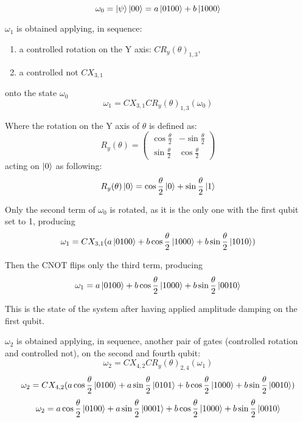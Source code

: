 \documentclass{masterthesis}
\begin{document}
\begin{equation}
    \omega_0 = \ket{\psi}\ket{00} = a\ket{0100} + b\ket{1000}
\end{equation}

$\omega_1$ is obtained applying, in sequence:
\begin{enumerate}
    \item a controlled rotation on the Y axis: $CR_{y}(\theta)_{1,3}$,
    \item a controlled not $CX_{3,1}$
\end{enumerate}
onto the state $\omega_0$
\begin{equation}
    \omega_1 = CX_{3,1} CR_{y}(\theta)_{1,3} (\omega_0)
\end{equation}

Where the rotation on the Y axis of $\theta$ is defined as:
\begin{equation}
    R_y(\theta) = \begin{pmatrix} \cos\frac{\theta}{2} & -\sin\frac{\theta}{2} \\ \sin\frac{\theta}{2} & \cos\frac{\theta}{2} \end{pmatrix}
\end{equation}
acting on $\ket{0}$ as following:
\begin{equation}
    R_y(\theta)\ket{0} = \cos\frac{\theta}{2}\ket{0} + \sin\frac{\theta}{2}\ket{1}
\end{equation}

Only the second term of $\omega_0$ is rotated, as it is the only one with the first qubit set to 1, producing
\begin{equation}
    \omega_1 = CX_{3,1} (a\ket{0100} + b\cos\frac{\theta}{2}\ket{1000} + b\sin\frac{\theta}{2}\ket{1010})
\end{equation}

Then the CNOT flips only the third term, producing
\begin{equation}
    \omega_1 = a\ket{0100} + b\cos\frac{\theta}{2}\ket{1000} + b\sin\frac{\theta}{2}\ket{0010}
\end{equation}

This is the state of the system after having applied amplitude damping on the first qubit.

$\omega_2$ is obtained applying, in sequence, another pair of gates (controlled rotation and controlled not), on the second and fourth qubit:
\begin{equation}
    \omega_2 = CX_{4,2} CR_{y}(\theta)_{2,4} (\omega_1)
\end{equation}
\begin{equation}
    \omega_2 = CX_{4,2} (a\cos\frac{\theta}{2}\ket{0100} + a\sin\frac{\theta}{2}\ket{0101} + b\cos\frac{\theta}{2}\ket{1000} + b\sin\frac{\theta}{2}\ket{0010})
\end{equation}
\begin{equation}
    \omega_2 = a\cos\frac{\theta}{2}\ket{0100} + a\sin\frac{\theta}{2}\ket{0001} + b\cos\frac{\theta}{2}\ket{1000} + b\sin\frac{\theta}{2}\ket{0010}
\end{equation}
\end{document}
